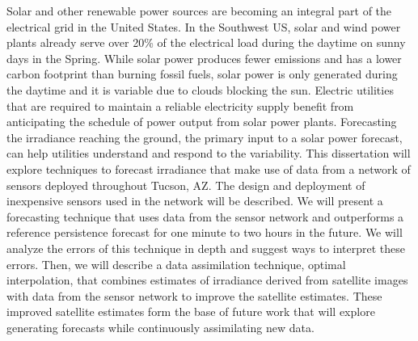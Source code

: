 Solar and other renewable power sources are becoming an integral part
of the electrical grid in the United States.
In the Southwest US, solar and wind power plants already serve over 20\%
of the electrical load during the daytime on sunny days in the Spring.
While solar power produces fewer emissions and has a lower carbon
footprint than burning fossil fuels, solar power is only generated
during the daytime and it is variable due to clouds blocking the sun.
Electric utilities that are required to maintain a reliable
electricity supply benefit from anticipating the schedule of power
output from solar power plants.
Forecasting the irradiance reaching the ground, the primary input to a
solar power forecast, can help utilities understand and respond to the
variability.
This dissertation will explore techniques to forecast irradiance that
make use of data from a network of sensors deployed throughout Tucson,
AZ.
The design and deployment of inexpensive sensors used in the network
will be described.
We will present a forecasting technique that uses data from the
sensor network and outperforms a reference persistence forecast for
one minute to two hours in the future.
We will analyze the errors of this technique in depth and suggest ways
to interpret these errors.
Then, we will describe a data assimilation technique, optimal
interpolation, that combines estimates of irradiance derived from
satellite images with data from the sensor network to improve the
satellite estimates.
These improved satellite estimates form the base of future work that will
explore generating forecasts while continuously assimilating new data.

